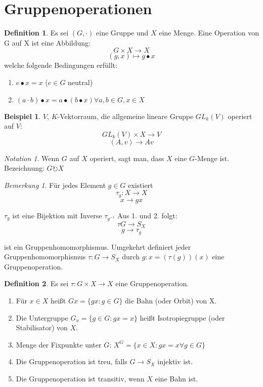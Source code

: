 \documentclass[12pt]{scrartcl}%
\theoremstyle{definition}
\newtheorem*{defn}{Definition}
\newtheorem{ex}{Beispiel}
\theoremstyle{remark}
\newtheorem*{notation}{Notation}
\newtheorem*{nb}{Bemerkung}
\begin{document}
\section{Gruppenoperationen}
	\begin{defn}
	Es sei $(G, \cdot)$ eine Gruppe und $X$ eine Menge. Eine Operation von G auf X ist eine Abbildung:
	$$G \times X \rightarrow X$$
	$$(g,x) \mapsto g\bullet x$$
	welche folgende Bedingungen erfüllt:
	\begin{enumerate}
		\item $e \bullet x = x$ ($e\in G$ neutral)
		\item $(a\cdot b)\bullet x = a\bullet (b\bullet x) \forall a,b\in G, x\in X$
	\end{enumerate}
	\end{defn}
	
	\begin{ex}
	$V$, $K$-Vektorraum, die allgemeine lineare Gruppe $GL_k(V)$ operiert auf $V$:
	$$GL_k(V) \times X \rightarrow V$$
	$$(A,v)\rightarrow Av$$
	\end{ex}

	\begin{notation}
	Wenn $G$ auf $X$ operiert, sagt man, dass $X$ eine $G$-Menge ist. Bezeichnung: $G\circlearrowright X$
	\end{notation}

	\begin{nb}
	Für jedes Element $g\in G$ existiert
	$$\tau_g: X \rightarrow X$$
	$$x \rightarrow gx$$
	\end{nb}
	
	$\tau_g$ ist eine Bijektion mit Inverse $\tau_{g^{-1}}$ Aus 1. und 2. folgt:
	$$\tau G \rightarrow S_X$$
	$$g \rightarrow \tau_g$$
	
	ist ein Gruppenhomomorphismus. Umgekehrt definiert jeder Gruppenhomomorphismus $\tau: G \rightarrow S_X$ durch 
	$g: x=(\tau(g))(x)$ eine Gruppenoperation.
	
	\begin{defn} Es sei $\tau: G \times X \rightarrow X$ eine Gruppenoperation.
	\begin{enumerate}
		\item Für $x\in X$ heißt $Gx=\{ gx : g \in G\}$ die Bahn (oder Orbit) von X. 
		\item Die Untergruppe $G_x=\{ g\in G : gx=x\}$ heißt Isotropiegruppe (oder Stabilisator) von $X$.
		\item Menge der Fixpunkte unter $G$: $X^G=\{ x \in X : gx=x \forall g \in G\}$
		\item Die Gruppenoperation ist treu, falls $G \rightarrow S_X$ injektiv ist.
		\item Die Gruppenoperation ist transitiv, wenn $X$ eine Bahn ist.
	\end{enumerate}
	\end{defn}
	
\end{document}
